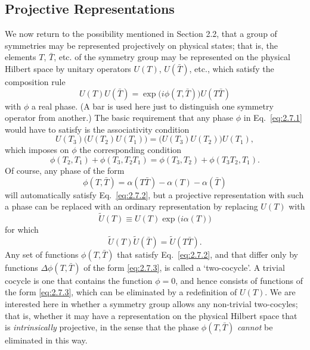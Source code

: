 
\subsection[Projective Representations]{Projective Representations\texorpdfstring{\protect\footnotemark}{}}

We now return to the possibility mentioned in Section 2.2, that a group of
symmetries may be represented projectively on physical states; that is, the
elements $T$, $\bar T$, etc. of the symmetry group may be represented on the
physical Hilbert space by unitary operators $U(T)$, $U(\bar T)$, etc., which
satisfy the composition rule
\begin{equation}
  U(T)U(\bar T)=\exp\bigl(i\phi(T,\bar T)\bigr)U(T\bar T)
  \tag{2.7.1}\label{eq:2.7.1}
\end{equation}
with $\phi$ a real phase. (A bar is used here just to distinguish one symmetry
operator from another.) The basic requirement that any phase $\phi$ in
Eq.~\eqref{eq:2.7.1} would have to satisfy is the associativity condition
\begin{equation*}
  U(T_3)\bigl(U(T_2)U(T_1)\bigr)
    =\bigl(U(T_3)U(T_2)\bigr)U(T_1),
\end{equation*}
which imposes on $\phi$ the corresponding condition
\begin{equation}
  \phi(T_2,T_1)+\phi(T_3,T_2T_1)
    =\phi(T_3,T_2)+\phi(T_3T_2,T_1).
  \tag{2.7.2}\label{eq:2.7.2}
\end{equation}
Of course, any phase of the form
\begin{equation}
  \phi(T,\bar T)=\alpha(T\bar T)-\alpha(T)-\alpha(\bar T)
  \tag{2.7.3}\label{eq:2.7.3}
\end{equation}
will automatically satisfy Eq.~\eqref{eq:2.7.2}, but a projective representation with
such a phase can be replaced with an ordinary representation by replacing
$U(T)$ with
\begin{equation*}
  \widetilde U(T)\equiv U(T)\exp\bigl(i\alpha(T)\bigr)
\end{equation*}
for which
\begin{equation*}
  \widetilde U(T)\widetilde U(\bar T)=\widetilde U(T\bar T).
\end{equation*}
Any set of functions $\phi(T,\bar T)$ that satisfy Eq.~\eqref{eq:2.7.2}, and that differ
only by functions $\Delta\phi(T,\bar T)$ of the form \eqref{eq:2.7.3}, is called a
`two-cocycle'. A trivial cocycle is one that contains the function $\phi=0$,
and hence consists of functions of the form \eqref{eq:2.7.3}, which can be eliminated by
a redefinition of $U(T)$. We are interested here in whether a symmetry group
allows any non-trivial two-cocyles; that is, whether it may have a
representation on the physical Hilbert space that is \emph{intrinsically}
projective, in the sense that the phase $\phi(T,\bar T)$ \emph{cannot} be
eliminated in this way.

